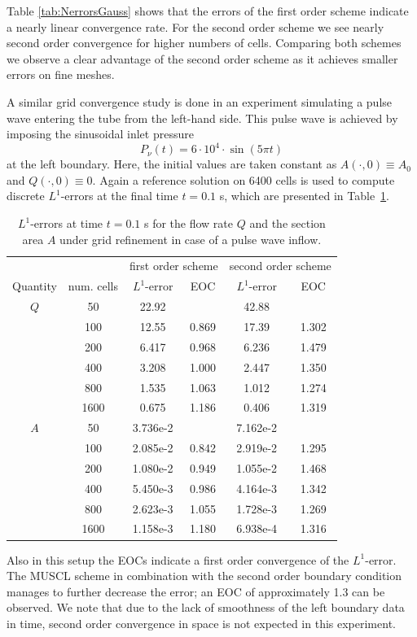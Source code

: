 \documentclass[a4paper,11pt]{article}
\begin{document}
Table \ref{tab:NerrorsGauss} shows that the errors of the first order scheme indicate a nearly linear convergence rate. For the second order scheme we see nearly second order convergence for higher numbers of cells. Comparing both schemes we observe a clear advantage of the second order scheme as it achieves smaller errors on fine meshes. 

A similar grid convergence study is done in an experiment simulating a pulse wave entering the tube from the left-hand side. This pulse wave is achieved by imposing the sinusoidal inlet pressure
\[
P_{\nu}(t) = 6 \cdot 10^4 \cdot \sin(5 \pi t)
\]
at the left boundary.
Here, the initial values are taken constant as $A(\cdot, 0) \equiv A_0$ and $Q(\cdot, 0) \equiv 0$. Again a reference solution on 6400 cells is used to compute discrete $L^1$-errors at the final time $t=0.1$ s, which are presented in Table~\ref{tab:Nerrors}.

\begin{table}
    \centering
    \caption{$L^1$-errors at time $t=0.1$ s for the flow rate $Q$ and the section area $A$ under grid refinement in case of a pulse wave inflow.}\label{tab:Nerrors}\vspace{1em}
    \footnotesize
    \begin{tabular}{cc|cc|cc}
      &&\multicolumn{2}{c|}{first order scheme} & \multicolumn{2}{c}{second order scheme} \\
        Quantity & num. cells & $L^1$-error & EOC & $L^1$-error & EOC \\
        \hline
           $Q$ & 50 & 22.92 &  & 42.88& \\
            & 100 & 12.55 & 0.869 & 17.39 & 1.302\\
            & 200 & 6.417 & 0.968 & 6.236 & 1.479\\
            & 400 & 3.208 & 1.000  & 2.447 & 1.350\\
            & 800 & 1.535 & 1.063 & 1.012 & 1.274\\
            & 1600 & 0.675 & 1.186 & 0.406 & 1.319\\
            \hline
            $A$& 50 & 3.736e-2 &  & 7.162e-2 & \\
            & 100 & 2.085e-2 & 0.842 & 2.919e-2 & 1.295\\
            & 200 & 1.080e-2 & 0.949 & 1.055e-2 & 1.468\\
            & 400 & 5.450e-3 & 0.986 & 4.164e-3 & 1.342\\
            & 800 & 2.623e-3 & 1.055 & 1.728e-3 & 1.269\\
            & 1600 & 1.158e-3 & 1.180 & 6.938e-4 & 1.316\\
    \end{tabular}
\end{table}
Also in this setup the EOCs indicate a first order convergence of the $L^1$-error. The MUSCL scheme in combination with the second order boundary condition manages to further decrease the error; an EOC of approximately 1.3 can be observed. We note that due to the lack of smoothness of the left boundary data in time, second order convergence in space is not expected in this experiment. 
\end{document}

